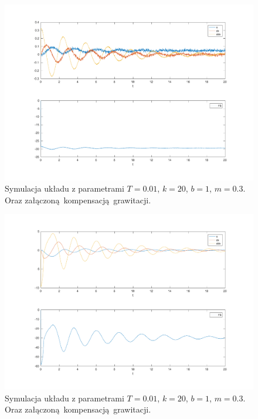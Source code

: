\documentclass[a4paper]{article}
\begin{document}
\begin{figure}[H]
	\includegraphics[width=0.99\linewidth]{grav_ideal_sys}
	\centering
	\caption{Symulacja układu z parametrami $T=0.01$, $k = 20$, $b = 1$, $m = 0.3$. Oraz załączoną kompensacją grawitacji.}
	\label{fig:system_ideal}
\end{figure}

\begin{figure}[H]
	\includegraphics[width=0.99\linewidth]{grav_normal_sys}
	\centering
	\caption{Symulacja układu z parametrami $T=0.01$, $k = 20$, $b = 1$, $m = 0.3$. Oraz załączoną kompensacją grawitacji.}
	\label{fig:system_komp}
\end{figure}
\end{document}

